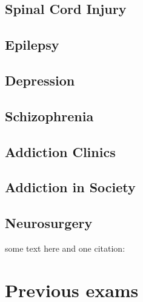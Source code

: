 \documentclass[12pt,article,oneside,a4paper]{memoir}
\begin{document}
\subsection{Spinal Cord Injury}

\subsection{Epilepsy}
 
\subsection{Depression}

\subsection{Schizophrenia}

\subsection{Addiction Clinics}

\subsection{Addiction in Society}

\subsection{Neurosurgery}
some text here and one citation: \cite{Example}

\newpage


\section{Previous exams}
\end{document}
